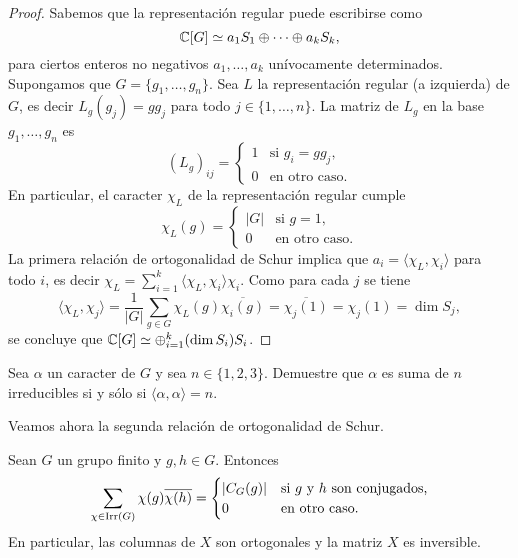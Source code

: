 \begin{proof}
    Sabemos que la representación regular puede escribirse como
    \[
    \mathbb{C}[G]\simeq a_1S_1\oplus\cdots\oplus a_kS_k,
    \]
    para ciertos enteros no negativos $a_1,\dots,a_k$ 
    unívocamente determinados. 
    Supongamos que $G=\{g_1,\dots,g_n\}$. Sea $L$ la representación regular (a izquierda) de $G$, es decir
    $L_g(g_j)=gg_j$ para todo $j\in\{1,\dots,n\}$. La matriz de $L_g$ 
    en la base $g_1,\dots,g_n$ es
    \[
    (L_g)_{ij}=\begin{cases}
    1 & \text{si $g_i=gg_j$},\\
    0 & \text{en otro caso}.
    \end{cases}
    \]
    En particular, el caracter $\chi_L$ de la representación regular cumple 
    \[
    \chi_L(g)=\begin{cases}
    |G| & \text{si $g=1$},\\
    0 & \text{en otro caso}.
    \end{cases}
    \]
    La primera relación de ortogonalidad de Schur implica que $a_i=\langle\chi_L,\chi_i\rangle$ para todo $i$, es decir 
    $\chi_L=\sum_{i=1}^k\langle\chi_L,\chi_i\rangle\chi_i$. 
    Como para cada $j$ se tiene 
    \[
    \langle\chi_L,\chi_j\rangle=\frac{1}{|G|}\sum_{g\in G}\chi_L(g)\overline{\chi_i(g)}=\overline{\chi_j(1)}=\chi_j(1)=\dim S_j,
    \]
    se concluye que $\mathbb{C}[G]\simeq\oplus_{i=1}^k(\dim S_i)S_i$. 
\end{proof}

\begin{exercise}
    Sea $\alpha$ un caracter de $G$ y sea $n\in\{1,2,3\}$. Demuestre que $\alpha$ es suma
    de $n$ irreducibles si y sólo si $\langle\alpha,\alpha\rangle=n$. 
\end{exercise}

Veamos ahora la segunda relación de ortogonalidad de Schur.

\begin{theorem}
  Sean $G$ un grupo finito y $g,h\in G$. 
  Entonces
  \[
	\sum_{\chi\in\operatorname{Irr}(G)}\chi(g)\overline{\chi(h)}=\begin{cases}
	  |C_G(g)| & \text{si $g$ y $h$ son conjugados,}\\
	  0 & \text{en otro caso.}
	\end{cases}
  \]
  En particular, las columnas de $X$ son ortogonales y la matriz $X$ es
  inversible.
\end{theorem}

